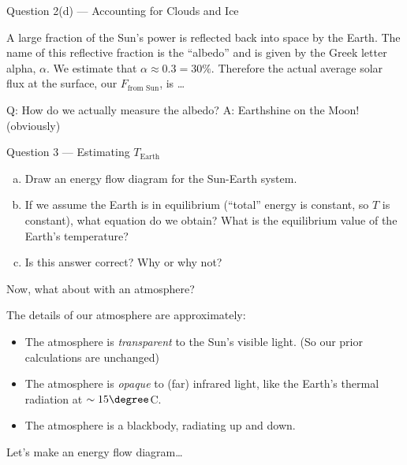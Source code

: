 \documentclass[12pt]{beamer}
\begin{document}
\begin{frame}{Question 2(d) --- Accounting for Clouds and Ice}

A large fraction of the Sun's power is reflected back into space by the Earth.  The name of this reflective fraction is the ``albedo'' and is given by the Greek letter  alpha, $\alpha$.  We estimate that $\alpha \approx 0.3 = 30\%$. Therefore the actual average solar flux at the surface, our $F_\text{from Sun}$, is \ldots


\vspace{5.5cm}

{\tiny Q: How do we actually measure the albedo? A: Earthshine on the Moon! (obviously)}
\end{frame}
\begin{frame}{Question 3 --- Estimating $T_\text{Earth}$}
	
	\begin{enumerate}[(a)]
	\item Draw an energy flow diagram for the Sun-Earth system.
	\item If we assume the Earth is in equilibrium (``total'' energy is constant, so $T$ is constant), what equation do we obtain?  What is the equilibrium value of the Earth's temperature?
	\item Is this answer correct?  Why or why not?
	\end{enumerate}
	


\vspace{7cm}

\end{frame}
\begin{frame}{Now, what about with an atmosphere?}

The details of our atmosphere are approximately:
	\begin{itemize}
	\item The atmosphere is {\em transparent} to the Sun's visible light. (So our prior calculations are unchanged)
	\item The atmosphere is {\em opaque} to (far) infrared light, like the Earth's thermal radiation at $\sim15\degree$C.
	\item The atmosphere is a blackbody, radiating up and down.
	\end{itemize}
Let's make an energy flow diagram\ldots

\vspace{7cm}

\end{frame}
\end{document}

